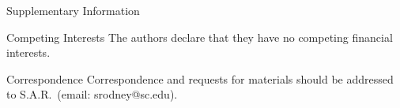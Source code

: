 \documentclass{nature_arxiv}
\begin{document}
\begin{methods}











\end{methods}






{}




\begin{addendum}
 \item[Supplementary Information] 
 \item 
 \item[Competing Interests] The authors declare that they have no
competing financial interests.
 \item[Correspondence] Correspondence and requests for materials
should be addressed to S.A.R.~(email: srodney@sc.edu).
\end{addendum}



\end{document}
